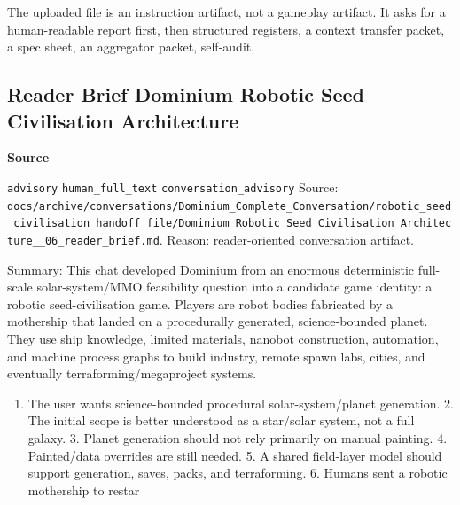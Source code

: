 \documentclass[9pt,a4paper,openany]{book}
\newcommand{\vonecallout}[3]{\par\medskip\noindent\begingroup\setlength{\fboxsep}{7pt}\colorbox{DomCalloutBg}{\parbox{0.94\linewidth}{\textbf{\textcolor{#1}{#2}}\par #3}}\endgroup\par\medskip}
\begin{document}
The uploaded file is an instruction artifact, not a gameplay artifact.\allowbreak{} It asks for a human-\allowbreak{}readable report first, then structured registers, a context transfer packet, a spec sheet, an aggregator packet, self-\allowbreak{}audit,



\subsection{Reader Brief Dominium Robotic Seed Civilisation Architecture}

\vonecallout{DomSlate}{Source}{\texttt{advisory} \texttt{human\_\allowbreak{}full\_\allowbreak{}text} \texttt{conversation\_\allowbreak{}advisory} Source: \texttt{docs/\allowbreak{}archive/\allowbreak{}conversations/\allowbreak{}Dominium\_\allowbreak{}Complete\_\allowbreak{}Conversation/\allowbreak{}robotic\_\allowbreak{}seed\_\allowbreak{}civilisation\_\allowbreak{}handoff\_\allowbreak{}file/\allowbreak{}Dominium\_\allowbreak{}Robotic\_\allowbreak{}Seed\_\allowbreak{}Civilisation\_\allowbreak{}Architecture\_\allowbreak{}\_\allowbreak{}06\_\allowbreak{}reader\_\allowbreak{}brief.\allowbreak{}md}.\allowbreak{} Reason: reader-\allowbreak{}oriented conversation artifact.\allowbreak{}}

Summary: This chat developed Dominium from an enormous deterministic full-\allowbreak{}scale solar-\allowbreak{}system/\allowbreak{}MMO feasibility question into a candidate game identity: a robotic seed-\allowbreak{}civilisation game.\allowbreak{} Players are robot bodies fabricated by a mothership that landed on a procedurally generated, science-\allowbreak{}bounded planet.\allowbreak{} They use ship knowledge, limited materials, nanobot construction, automation, and machine process graphs to build industry, remote spawn labs, cities, and eventually terraforming/\allowbreak{}megaproject systems.\allowbreak{}


\begin{enumerate}
\item The user wants science-\allowbreak{}bounded procedural solar-\allowbreak{}system/\allowbreak{}planet generation.\allowbreak{} 2.\allowbreak{} The initial scope is better understood as a star/\allowbreak{}solar system, not a full galaxy.\allowbreak{} 3.\allowbreak{} Planet generation should not rely primarily on manual painting.\allowbreak{} 4.\allowbreak{} Painted/\allowbreak{}data overrides are still needed.\allowbreak{} 5.\allowbreak{} A shared field-\allowbreak{}layer model should support generation, saves, packs, and terraforming.\allowbreak{} 6.\allowbreak{} Humans sent a robotic mothership to restar
\end{enumerate}
\end{document}
